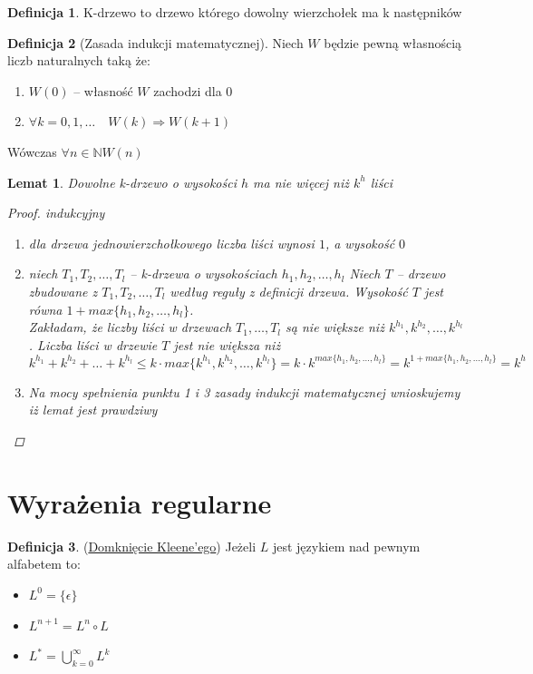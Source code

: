 \documentclass[12pt,a4paper]{article}
\newtheorem{lemat}{Lemat}
\theoremstyle{definition}
\newtheorem{df}{Definicja}
\theoremstyle{remark}
\begin{document}
	\begin{df}
		K-drzewo to drzewo którego dowolny wierzchołek ma k następników
	\end{df}
	
	\begin{df}[Zasada indukcji matematycznej]
		Niech $W$ będzie pewną własnością liczb naturalnych taką że:
		\begin{enumerate}
			\item $W(0)$ -- własność $W$ zachodzi dla $0$
			\item $\forall k=0, 1, \dots \quad W(k) \Rightarrow W(k+1)$ 
		\end{enumerate}
		Wówczas $\forall n \in \mathbb{N} W(n)$
	\end{df}
	
	\begin{lemat}
		Dowolne k-drzewo o wysokości $h$ ma nie więcej niż $k^h$ liści
		\begin{proof} \emph{indukcyjny}\\
			\begin{enumerate}
				\item dla drzewa jednowierzchołkowego liczba liści wynosi $1$, a wysokość $0$
				\item niech $T_1, T_2, \dots, T_l$ -- k-drzewa o wysokościach $h_1, h_2, \dots, h_l$
				Niech $T$ -- drzewo zbudowane z $T_1, T_2, \dots, T_l$ według reguły z definicji drzewa. 
				Wysokość $T$ jest równa $1 + max\{h_1, h_2, \dots, h_l\}$.\\
				Zakładam, że liczby liści w drzewach $T_1, \dots, T_l$ są nie większe niż $k^{h_1}, k^{h_2}, \dots, k^{h_l}$. 
				Liczba liści w drzewie $T$ jest nie większa niż 
				$$k^{h_1} + k^{h_2} + \dots + k^{h_l} \leqslant k\cdot max\{k^{h_1}, k^{h_2}, \dots, k^{h_l}\} = k\cdot k^{max\{h_1, h_2, \dots, h_l\}} 
				= k^{1 + max\{h_1, h_2, \dots, h_l\}} = k^h$$
				\item Na mocy spełnienia punktu 1 i 3 zasady indukcji matematycznej wnioskujemy iż lemat jest prawdziwy
			\end{enumerate}
		\end{proof}
	\end{lemat}
	
\section{Wyrażenia regularne}
	
	\begin{df}(\href{http://pl.wikipedia.org/wiki/Domkni%C4%99cie_Kleene'ego}{Domknięcie Kleene'ego}) Jeżeli $L$ jest językiem nad pewnym alfabetem to:
		\begin{itemize}
			\item $L^0 = \{\epsilon\}$
			\item $L^{n+1} = L^n \circ L$
			\item $L^* = \bigcup_{k=0}^\infty L^k$
		\end{itemize}
	\end{df}	
	
\end{document}

